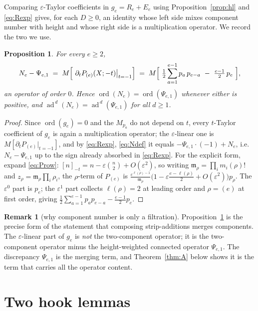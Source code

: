 \documentclass[11pt]{article}
\theoremstyle{plain}
\newtheorem{proposition}[theorem]{Proposition}
\theoremstyle{definition}
\newtheorem{remark}[theorem]{Remark}
\DeclareMathOperator{\ord}{ord}
\DeclareMathOperator{\ad}{ad}
\newcommand{\eps}{\varepsilon}
\begin{document}
Comparing $\eps$-Taylor coefficients in $g_e=R_e+E_e$ using
Proposition~\ref{prop:hl} and \eqref{eq:Rexp} gives, for each $D\ge0$, an
identity whose left side mixes component number with height and whose right
side is a multiplication operator.  We record the two we use.

\begin{proposition}\label{prop:merge}
For every $e\ge2$,
\[
  N_e-\Psi_{e,1}
  \;=\;M\Bigl[\ \partial_t P_{(e)}(X;-t)\big|_{t=-1}\Bigr]
  \;=\;M\Bigl[\ \tfrac12\sum_{a=1}^{e-1}p_a\,p_{e-a}\ -\ \tfrac{e-1}{2}\,p_e\ \Bigr],
\]
an operator of order $0$.  Hence $\ord(N_e)=\ord(\Psi_{e,1})$ whenever either is
positive, and $\ad^{\,d}(N_e)=\ad^{\,d}(\Psi_{e,1})$ for all $d\ge1$.
\end{proposition}

\begin{proof}
Since $\ord(g_e)=0$ and the $M_{p_a}$ do not depend on $t$, every $t$-Taylor
coefficient of $g_e$ is again a multiplication operator; the $\eps$-linear one
is $M[\partial_tP_{(e)}|_{t=-1}]$, and by \eqref{eq:Rexp}, \eqref{eq:Ndef} it
equals $-\Psi_{e,1}\cdot(-1)+N_e$, i.e.\ $N_e-\Psi_{e,1}$ up to the sign already
absorbed in \eqref{eq:Rexp}.  For the explicit form, expand \eqref{eq:Prow}:
$[n]_{-t}=n-\eps\binom{n}{2}+O(\eps^2)$, so writing
$\mathfrak m_\rho=\prod_i m_i(\rho)!$ and $z_\rho=\mathfrak m_\rho\prod_i\rho_i$,
the $\rho$-term of $P_{(e)}$ is
$\frac{\eps^{\ell(\rho)-1}}{\mathfrak m_\rho}
\bigl(1-\eps\frac{e-\ell(\rho)}{2}+O(\eps^2)\bigr)p_\rho$.  The $\eps^0$ part is
$p_e$; the $\eps^1$ part collects $\ell(\rho)=2$ at leading order and
$\rho=(e)$ at first order, giving
$\frac12\sum_{a=1}^{e-1}p_ap_{e-a}-\frac{e-1}{2}p_e$.
\end{proof}

\begin{remark}[why component number is only a filtration]
Proposition~\ref{prop:merge} is the precise form of the statement that
composing strip-additions merges components.  The $\eps$-linear part of $g_e$ is
\emph{not} the two-component operator; it is the two-component operator minus
the height-weighted connected operator $\Psi_{e,1}$.  The discrepancy
$\Psi_{e,1}$ is the merging term, and Theorem~\ref{thm:A} below shows it is the
term that carries all the operator content.
\end{remark}

\section{Two hook lemmas}
\end{document}
